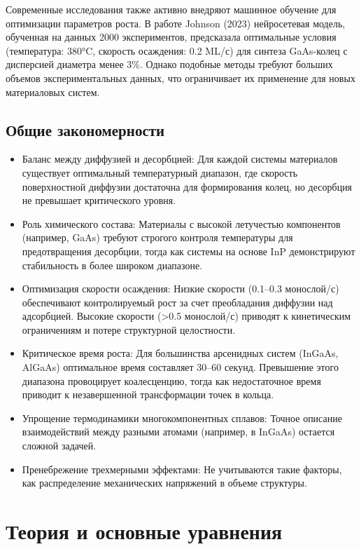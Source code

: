 \documentclass[14pt,oneside]{extarticle}
\begin{document}
Современные исследования также активно внедряют машинное обучение для оптимизации параметров роста. В работе Johnson (2023) 
нейросетевая модель, обученная на данных 2000 экспериментов, предсказала оптимальные условия (температура: 380°C, скорость осаждения: 0.2 ML/с) для синтеза GaAs-колец с дисперсией диаметра менее 3\%. Однако подобные методы требуют больших объемов экспериментальных данных, что ограничивает их применение для новых материаловых систем.

\subsection{Общие закономерности}

\begin{itemize}
    \item Баланс между диффузией и десорбцией: Для каждой системы материалов существует оптимальный температурный диапазон, где скорость поверхностной диффузии достаточна для формирования колец, но десорбция не превышает критического уровня.
    \item Роль химического состава: Материалы с высокой летучестью компонентов (например, GaAs) требуют строгого контроля температуры для предотвращения десорбции, тогда как системы на основе InP демонстрируют стабильность в более широком диапазоне.
    \item Оптимизация скорости осаждения: Низкие скорости (0.1–0.3 монослой/с) обеспечивают контролируемый рост за счет преобладания диффузии над адсорбцией. Высокие скорости (>0.5 монослой/с) приводят к кинетическим ограничениям и потере структурной целостности.
    \item Критическое время роста: Для большинства арсенидных систем (InGaAs, AlGaAs) оптимальное время составляет 30–60 секунд. Превышение этого диапазона провоцирует коалесценцию, тогда как недостаточное время приводит к незавершенной трансформации точек в кольца.
    \item Упрощение термодинамики многокомпонентных сплавов: Точное описание взаимодействий между разными атомами (например, в InGaAs) остается сложной задачей.
    \item Пренебрежение трехмерными эффектами: Не учитываются такие факторы, как распределение механических напряжений в объеме структуры.
\end{itemize}

\pagebreak
\section{Теория и основные уравнения}
\end{document}
